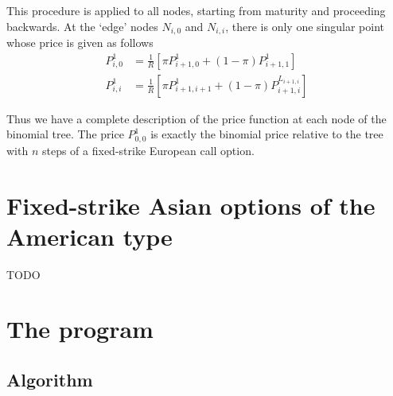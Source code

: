 This procedure is applied to all nodes, starting from maturity and proceeding backwards. At the `edge' nodes $ N_{i,0} $ and $ N_{i,i} $, there is only one singular point whose price is given as follows
\begin{subequations}
	\label{eq:asian-terminal-nodes}
	\begin{align}
		P_{i,0}^1 &= \frac{1}{R} \left[ \pi P_{i+1,0}^1 + (1 - \pi) P_{i+1,1}^1 \right] \\
		P_{i,i}^1 &= \frac{1}{R} \left[ \pi P_{i+1,i+1}^1 + (1 - \pi) P_{i+1,i}^{L_{i+1,i}} \right]
	\end{align}
\end{subequations}

Thus we have a complete description of the price function at each node of the binomial tree. The price $ P_{0,0}^1 $ is exactly the binomial price relative to the tree with $n$ steps of a fixed-strike European call option.


\section{Fixed-strike Asian options of the American type}
\label{sec:fixed-strike-am}



TODO
\clearpage
\section{The program}
\label{sec:asian-program}

\subsection{Algorithm}


